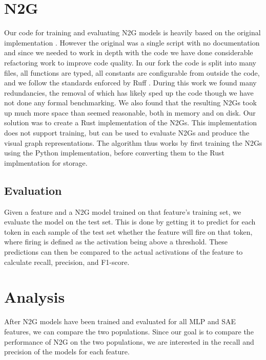 \section{N2G}
Our code for training and evaluating N2G models is heavily based on the original implementation .
However the original was a single script with no documentation and since we needed to work in depth with the code we have done considerable refactoring work to improve code quality.
In our fork  the code is split into many files, all functions are typed, all constants are configurable from outside the code, and we follow the standards enforced by Ruff .
During this work we found many redundancies, the removal of which has likely sped up the code though we have not done any formal benchmarking.
We also found that the resulting N2Gs took up much more space than seemed reasonable, both in memory and on disk.
Our solution was to create a Rust implementation of the N2Gs.
This implementation does not support training, but can be used to evaluate N2Gs and produce the visual graph representations.
The algorithm thus works by first training the N2Gs using the Python implementation, before converting them to the Rust implmentation for storage.

\subsection{Evaluation}
Given a feature and a N2G model trained on that feature's training set, we evaluate the model on the test set.
This is done by getting it to predict for each token in each sample of the test set whether the feature will fire on that token, where firing is defined as the activation being above a threshold.
These predictions can then be compared to the actual activations of the feature to calculate recall, precision, and F1-score.

\section{Analysis}
After N2G models have been trained and evaluated for all MLP and SAE features, we can compare the two populations.
Since our goal is to compare the performance of N2G on the two populations, we are interested in the recall and precision of the models for each feature.





